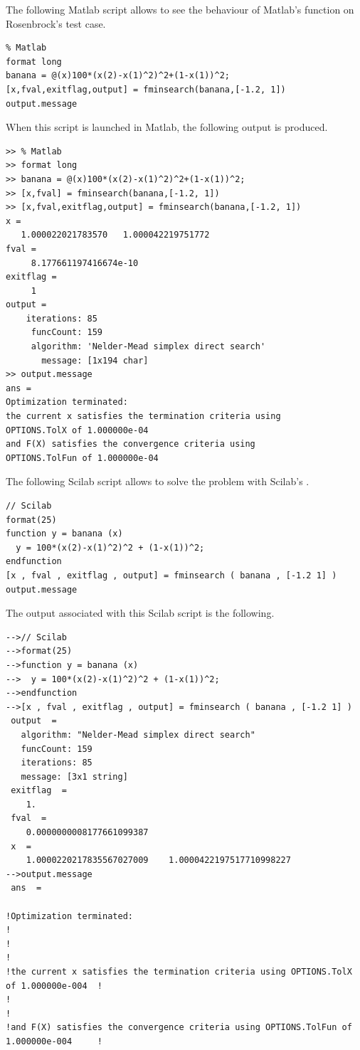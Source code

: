 The following Matlab script allows to see the behaviour of Matlab's 
function on Rosenbrock's test case.

\lstset{language=matlabscript}
\begin{lstlisting}
% Matlab
format long
banana = @(x)100*(x(2)-x(1)^2)^2+(1-x(1))^2;
[x,fval,exitflag,output] = fminsearch(banana,[-1.2, 1])
output.message
\end{lstlisting}

When this script is launched in Matlab, the following output is 
produced.

\lstset{language=matlabscript}
\begin{lstlisting}
>> % Matlab
>> format long
>> banana = @(x)100*(x(2)-x(1)^2)^2+(1-x(1))^2;
>> [x,fval] = fminsearch(banana,[-1.2, 1])
>> [x,fval,exitflag,output] = fminsearch(banana,[-1.2, 1])
x =
   1.000022021783570   1.000042219751772
fval =
     8.177661197416674e-10
exitflag =
     1
output =
    iterations: 85
     funcCount: 159
     algorithm: 'Nelder-Mead simplex direct search'
       message: [1x194 char]
>> output.message
ans =
Optimization terminated:
the current x satisfies the termination criteria using
OPTIONS.TolX of 1.000000e-04
and F(X) satisfies the convergence criteria using
OPTIONS.TolFun of 1.000000e-04
\end{lstlisting}

The following Scilab script allows to solve the problem with Scilab's 
.

\lstset{language=scilabscript}
\begin{lstlisting}
// Scilab
format(25)
function y = banana (x)
  y = 100*(x(2)-x(1)^2)^2 + (1-x(1))^2;
endfunction
[x , fval , exitflag , output] = fminsearch ( banana , [-1.2 1] )
output.message
\end{lstlisting}

The output associated with this Scilab script is the following.

\lstset{language=scilabscript}
\begin{lstlisting}
-->// Scilab
-->format(25)
-->function y = banana (x)
-->  y = 100*(x(2)-x(1)^2)^2 + (1-x(1))^2;
-->endfunction
-->[x , fval , exitflag , output] = fminsearch ( banana , [-1.2 1] )
 output  =
   algorithm: "Nelder-Mead simplex direct search"
   funcCount: 159
   iterations: 85
   message: [3x1 string]
 exitflag  =
    1.  
 fval  =
    0.0000000008177661099387  
 x  =
    1.0000220217835567027009    1.0000422197517710998227  
-->output.message
 ans  =
 
!Optimization terminated:                                                              !
!                                                                                      !
!the current x satisfies the termination criteria using OPTIONS.TolX of 1.000000e-004  !
!                                                                                      !
!and F(X) satisfies the convergence criteria using OPTIONS.TolFun of 1.000000e-004     !
\end{lstlisting}

